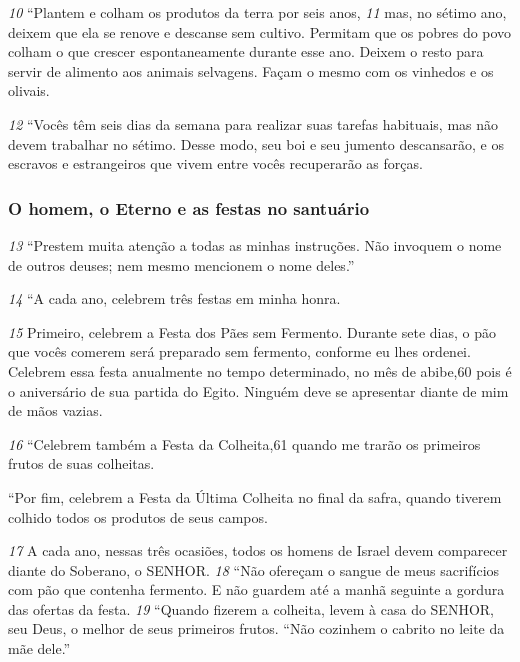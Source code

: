 \smallskip
\textit{\tiny 10}
“Plantem e colham os produtos da terra por seis anos, 
\textit{\tiny 11}
mas, no sétimo ano,
deixem que ela se renove e descanse sem cultivo. Permitam que os pobres do
povo colham o que crescer espontaneamente durante esse ano. Deixem o resto
para servir de alimento aos animais selvagens. Façam o mesmo com os vinhedos e
os olivais.
   
\smallskip
\textit{\tiny 12}
“Vocês têm seis dias da semana para realizar suas tarefas habituais, mas não
devem trabalhar no sétimo. Desse modo, seu boi e seu jumento descansarão, e os
escravos e estrangeiros que vivem entre vocês recuperarão as forças.
   
\bigskip
\subsubsection*{O homem, o Eterno e as festas no santuário}
\textit{\tiny 13}
“Prestem muita atenção a todas as minhas instruções. Não invoquem o nome
de outros deuses; nem mesmo mencionem o nome deles.”

\smallskip
\textit{\tiny 14}
“A cada ano, celebrem três festas em minha honra. 

\smallskip
\textit{\tiny 15}
Primeiro, celebrem a Festa
dos Pães sem Fermento. Durante sete dias, o pão que vocês comerem será
preparado sem fermento, conforme eu lhes ordenei. Celebrem essa festa
anualmente no tempo determinado, no mês de abibe,60 pois é o aniversário de sua
partida do Egito. Ninguém deve se apresentar diante de mim de mãos vazias.
   
\smallskip
\textit{\tiny 16}
“Celebrem também a Festa da Colheita,61 quando me trarão os primeiros
frutos de suas colheitas.

\smallskip
   “Por fim, celebrem a Festa da Última Colheita no final da safra, quando
tiverem colhido todos os produtos de seus campos. 

\smallskip
\textit{\tiny 17}
A cada ano, nessas três
ocasiões, todos os homens de Israel devem comparecer diante do Soberano, o
SENHOR.
\textit{\tiny 18}
“Não ofereçam o sangue de meus sacrifícios com pão que contenha
fermento. E não guardem até a manhã seguinte a gordura das ofertas da festa.
\textit{\tiny 19}
“Quando fizerem a colheita, levem à casa do SENHOR, seu Deus, o melhor de
seus primeiros frutos.
   “Não cozinhem o cabrito no leite da mãe dele.”

\bigskip
